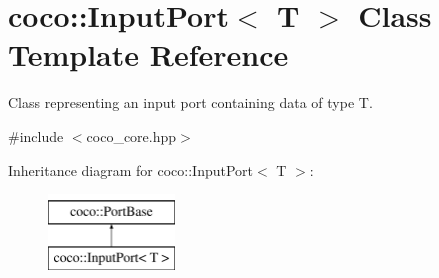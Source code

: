 \hypertarget{classcoco_1_1_input_port}{}\section{coco\+:\+:Input\+Port$<$ T $>$ Class Template Reference}
\label{classcoco_1_1_input_port}


Class representing an input port containing data of type T.  




{\ttfamily \#include $<$coco\+\_\+core.\+hpp$>$}

Inheritance diagram for coco\+:\+:Input\+Port$<$ T $>$\+:\begin{figure}[H]
\begin{center}
\leavevmode
\includegraphics[height=2.000000cm]{classcoco_1_1_input_port}
\end{center}
\end{figure}

